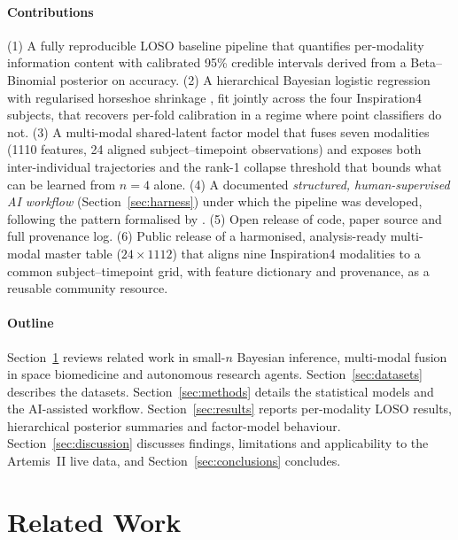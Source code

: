 \documentclass[11pt,a4paper,3p,authoryear]{elsarticle}
\begin{document}
\paragraph{Contributions} (1) A fully reproducible LOSO baseline pipeline that quantifies per-modality information content with calibrated 95\% credible intervals derived from a Beta--Binomial posterior on accuracy. (2) A hierarchical Bayesian logistic regression with regularised horseshoe shrinkage \citep{Carvalho2010horseshoe,Piironen2017regularised}, fit jointly across the four Inspiration4 subjects, that recovers per-fold calibration in a regime where point classifiers do not. (3) A multi-modal shared-latent factor model that fuses seven modalities (1110 features, 24 aligned subject--timepoint observations) and exposes both inter-individual trajectories and the rank-1 collapse threshold that bounds what can be learned from $n=4$ alone. (4) A documented \emph{structured, human-supervised AI workflow} (Section~\ref{sec:harness}) under which the pipeline was developed, following the pattern formalised by \citet{Zhou2026nora}. (5) Open release of code, paper source and full provenance log. (6) Public release of a harmonised, analysis-ready multi-modal master table ($24 \times 1112$) that aligns nine Inspiration4 modalities to a common subject--timepoint grid, with feature dictionary and provenance, as a reusable community resource.

\paragraph{Outline} Section~\ref{sec:related} reviews related work in small-$n$ Bayesian inference, multi-modal fusion in space biomedicine and autonomous research agents. Section~\ref{sec:datasets} describes the datasets. Section~\ref{sec:methods} details the statistical models and the AI-assisted workflow. Section~\ref{sec:results} reports per-modality LOSO results, hierarchical posterior summaries and factor-model behaviour. Section~\ref{sec:discussion} discusses findings, limitations and applicability to the Artemis~II live data, and Section~\ref{sec:conclusions} concludes.

\section{Related Work}\label{sec:related}
\end{document}
